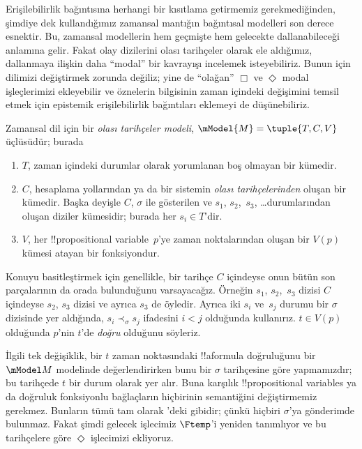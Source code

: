 



Erişilebilirlik bağıntısına herhangi bir kısıtlama getirmemiz gerekmediğinden,
şimdiye dek kullandığımız zamansal mantığın bağıntısal modelleri son derece
esnektir. Bu, zamansal modellerin hem geçmişte hem gelecekte dallanabileceği
anlamına gelir. Fakat olay dizilerini olası tarihçeler olarak ele aldığımız,
dallanmaya ilişkin daha ``modal'' bir kavrayışı incelemek isteyebiliriz. Bunun
için dilimizi değiştirmek zorunda değiliz; yine de ``olağan'' $\Box$ ve
$\Diamond$ modal işleçlerimizi ekleyebilir ve öznelerin bilgisinin zaman
içindeki değişimini temsil etmek için epistemik erişilebilirlik bağıntıları
eklemeyi de düşünebiliriz.

\begin{defn}
  Zamansal dil için bir \emph{olası tarihçeler modeli},
  $\mModel{M}=\tuple{T,C,V}$ üçlüsüdür; burada
  \begin{enumerate}
    \item $T$, zaman içindeki durumlar olarak yorumlanan boş olmayan bir kümedir.
    \item $C$, hesaplama yollarından ya da bir sistemin \emph{olası
      tarihçelerinden} oluşan bir kümedir. Başka deyişle $C$, $\sigma$ ile
      gösterilen ve $s_1$, $s_2$,~$s_3$, \dots durumlarından oluşan diziler
      kümesidir; burada her $s_i\in T$'dir.
    \item $V$, her !!{propositional variable}~$p$'ye zaman noktalarından
      oluşan bir $V(p)$ kümesi atayan bir fonksiyondur.
  \end{enumerate}
  Konuyu basitleştirmek için genellikle, bir tarihçe $C$ içindeyse onun bütün
  son parçalarının da orada bulunduğunu varsayacağız. Örneğin $s_1$,
  $s_2$,~$s_3$ dizisi $C$ içindeyse $s_2$, $s_3$ dizisi ve ayrıca $s_3$ de
  öyledir. Ayrıca iki $s_i$ ve~$s_j$ durumu bir $\sigma$ dizisinde
  yer aldığında, $s_i\prec_\sigma s_j$ ifadesini $i<j$ olduğunda kullanırız.
  $t\in V(p)$
  olduğunda $p$'nin $t$'de \emph{doğru} olduğunu söyleriz.
\end{defn}

İlgili tek değişiklik, bir $t$ zaman noktasındaki !!a{formula} doğruluğunu
bir $\mModel M$ modelinde değerlendirirken bunu bir $\sigma$ tarihçesine
göre yapmamızdır; bu tarihçede $t$ bir durum olarak yer alır. Buna karşılık
!!{propositional variable}s ya da doğruluk fonksiyonlu bağlaçların hiçbirinin
semantiğini değiştirmemiz gerekmez. Bunların tümü tam olarak
'deki gibidir; çünkü hiçbiri $\sigma$'ya gönderimde
bulunmaz. Fakat şimdi gelecek işlecimiz $\Ftemp$'i yeniden tanımlıyor ve bu
tarihçelere göre $\Diamond$ işlecimizi ekliyoruz.

